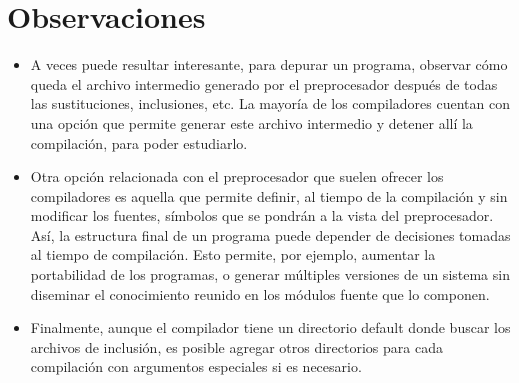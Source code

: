 \section{Observaciones}

\begin{itemize}
	\item A veces puede resultar interesante, para depurar un programa, observar cómo queda el archivo
intermedio generado por el preprocesador después de todas las sustituciones, inclusiones, etc. La
mayoría de los compiladores cuentan con una opción que permite generar este archivo intermedio y
detener allí la compilación, para poder estudiarlo.
	\item Otra opción relacionada con el preprocesador que suelen ofrecer los compiladores es aquella que
permite definir, al tiempo de la compilación y sin modificar los fuentes, símbolos que se pondrán a la
vista del preprocesador. Así, la estructura final de un programa puede depender de decisiones tomadas
al tiempo de compilación. Esto permite, por ejemplo, aumentar la portabilidad de los programas, o
generar múltiples versiones de un sistema sin diseminar el conocimiento reunido en los módulos
fuente que lo componen.
	\item Finalmente, aunque el compilador tiene un directorio default donde buscar los archivos de inclusión,
es posible agregar otros directorios para cada compilación con argumentos especiales si es necesario.
\end{itemize}




